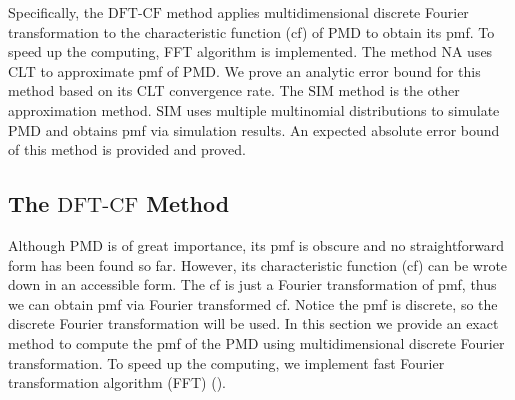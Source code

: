 \documentclass[12pt]{article}
\newcommand{\PMD}{\textrm{PMD}}
\newcommand{\SIM}{{\textrm{SIM}}}
\newcommand{\NA}{{\textrm{NA}}}
\newcommand{\dft}{{\textrm{DFT-CF}}}
\begin{document}
Specifically, the $\dft$ method applies multidimensional discrete Fourier transformation to the characteristic function (cf) of $\PMD$ to obtain its pmf. To speed up the computing, FFT algorithm is implemented. The method $\NA$ uses CLT to approximate pmf of $\PMD$. We prove an analytic error bound for this method based on its CLT convergence rate. The $\SIM$ method is the other approximation method. $\SIM$ uses multiple multinomial distributions to simulate $\PMD$ and obtains pmf via simulation results. An expected absolute error bound of this method is provided and proved.

\subsection{The $\dft$ Method}
Although $\PMD$ is of great importance, its pmf is obscure and no straightforward form has been found so far. However, its characteristic function (cf) can be wrote down in an accessible form. The cf is just a Fourier transformation of pmf, thus we can obtain pmf via Fourier transformed cf. Notice the pmf is discrete, so the discrete Fourier transformation will be used. In this section we provide an exact method to compute the pmf of the PMD using multidimensional discrete Fourier transformation. To speed up the computing, we implement fast Fourier transformation algorithm (FFT) ().
\end{document}
